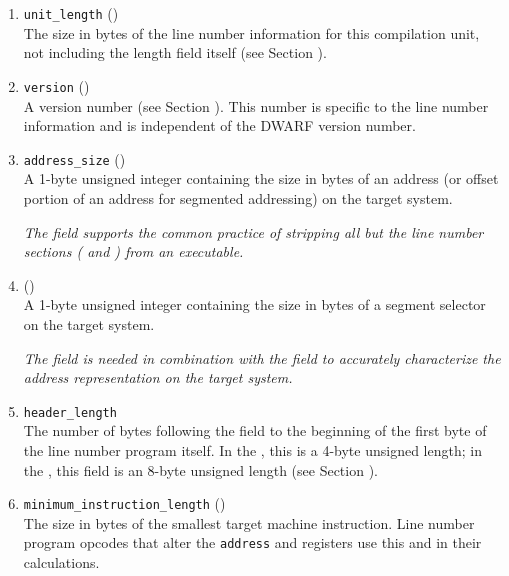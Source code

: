 \begin{enumerate}[1. ]
\item \texttt{unit\_length} ()  \\
The size in bytes of the line number information for this
compilation unit, not including the length field itself
(see Section ). 

\item \texttt{version} (\HFTuhalf) \\
A version number 
(see Section ). 
This number is specific to
the line number information and is independent of the DWARF
version number. 

\item \texttt{address\_size} (\HFTubyte)\\
A 1-byte unsigned integer containing the size in bytes of an
address (or offset portion of an address for segmented addressing)
on the target system.

\textit{The  field 
\bb
supports 
\eb
the common practice of stripping all but 
the line number sections (\dotdebugline{} and \dotdebuglinestr{}) 
from an executable.}

\item \HFNsegmentselectorsize{} (\HFTubyte) \\
A 1-byte unsigned integer containing the size in bytes of a segment
selector on the target system.
   
\textit{The \HFNsegmentselectorsize{} field 
\bbeb
is needed in combination with the  field 
to accurately characterize the address representation on the target 
system.}

\item \texttt{header\_length}  \\
The number of bytes following the  field to the
beginning of the first byte of the line number program itself.
In the \thirtytwobitdwarfformat, this is a 4-byte unsigned
length; in the \sixtyfourbitdwarfformat, this field is an
8-byte unsigned length 
(see Section ). 

\item \texttt{minimum\_instruction\_length} (\HFTubyte)  \\
The size in bytes of the smallest target machine
instruction. Line number program opcodes that alter
the \texttt{address} and 
registers use this and
in their calculations. 


\end{enumerate}
